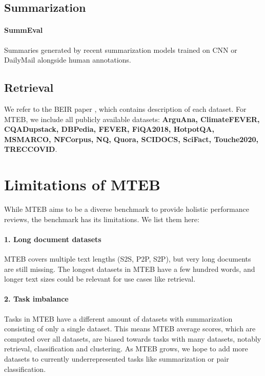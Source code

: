\documentclass[11pt]{article}
\begin{document}
\subsection{Summarization}

\paragraph{SummEval} \cite{fabbri2020summeval} Summaries generated by recent summarization models trained on CNN or DailyMail alongside human annotations.

\subsection{Retrieval}

We refer to the BEIR paper \cite{beir}, which contains description of each dataset. For MTEB, we include all publicly available datasets: \textbf{ArguAna, ClimateFEVER, CQADupstack, DBPedia, FEVER, FiQA2018, HotpotQA, MSMARCO, NFCorpus, NQ, Quora, SCIDOCS, SciFact, Touche2020, TRECCOVID}.

\section{Limitations of MTEB}

While MTEB aims to be a diverse benchmark to provide holistic performance reviews, the benchmark has its limitations. We list them here:

\paragraph{1. Long document datasets} MTEB covers multiple text lengths (S2S, P2P, S2P), but very long documents are still missing. The longest datasets in MTEB have a few hundred words, and longer text sizes could be relevant for use cases like retrieval.

\paragraph{2. Task imbalance} Tasks in MTEB have a different amount of datasets with summarization consisting of only a single dataset. This means MTEB average scores, which are computed over all datasets, are biased towards tasks with many datasets, notably retrieval, classification and clustering. As MTEB grows, we hope to add more datasets to currently underrepresented tasks like summarization or pair classification.
\end{document}
